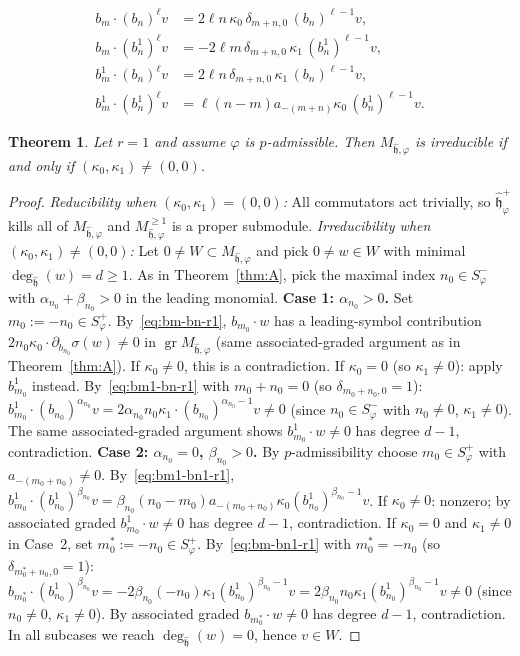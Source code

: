 \documentclass[10pt,a4paper]{amsart}
\newtheorem{theorem}{Theorem}
\DeclareMathOperator{\gr}{gr}
\newcommand{\h}{\mathfrak{h}}
\newcommand{\wh}[1]{\widehat{#1}}
\newcommand{\whh}{\wh{\h}}
\begin{document}
\begin{align}
b_m\cdot(b_n)^\ell v
  &=2\ell n\,\kappa_0\,\delta_{m+n,0}\,(b_n)^{\ell-1}v,
  \label{eq:bm-bn-r1}\\
b_m\cdot(b_n^1)^\ell v
  &=-2\ell m\,\delta_{m+n,0}\,\kappa_1\,(b_n^1)^{\ell-1}v,
  \label{eq:bm-bn1-r1}\\
b_m^1\cdot(b_n)^\ell v
  &=2\ell n\,\delta_{m+n,0}\,\kappa_1\,(b_n)^{\ell-1}v,
  \label{eq:bm1-bn-r1}\\
b_m^1\cdot(b_n^1)^\ell v
  &=\ell(n-m)a_{-(m+n)}\kappa_0\,(b_n^1)^{\ell-1}v.
  \label{eq:bm1-bn1-r1}
\end{align}

\begin{theorem}\label{thm:A-prime}
Let $r=1$ and assume $\varphi$ is $p$-admissible.  Then
$M_{\whh,\varphi}$ is irreducible if and only if
$(\kappa_0,\kappa_1)\neq(0,0)$.
\end{theorem}

\begin{proof}
\emph{Reducibility when $(\kappa_0,\kappa_1)=(0,0)$:}
All commutators act trivially, so $\whh_\varphi^+$ kills all of
$M_{\whh,\varphi}$ and $M_{\whh,\varphi}^{\ge1}$ is a proper submodule.
\emph{Irreducibility when $(\kappa_0,\kappa_1)\neq(0,0)$:}
Let $0\neq W\subset M_{\whh,\varphi}$ and pick $0\neq w\in W$ with
minimal $\deg_{\whh}(w)=d\ge1$.
As in Theorem~\ref{thm:A}, pick the maximal index $n_0\in S_\varphi^-$
with $\alpha_{n_0}+\beta_{n_0}>0$ in the leading monomial.
\textbf{Case 1: $\alpha_{n_0}>0$.}  Set $m_0:=-n_0\in S_\varphi^+$.
By~\eqref{eq:bm-bn-r1}, $b_{m_0}\cdot w$ has a leading-symbol contribution
$2n_0\kappa_0\cdot\partial_{b_{n_0}}\sigma(w)\neq0$ in
$\gr M_{\whh,\varphi}$ (same associated-graded argument as in
Theorem~\ref{thm:A}).  If $\kappa_0\neq0$, this is a contradiction.
If $\kappa_0=0$ (so $\kappa_1\neq0$): apply $b_{m_0}^1$ instead.
By~\eqref{eq:bm1-bn-r1} with $m_0+n_0=0$ (so $\delta_{m_0+n_0,0}=1$):
$b_{m_0}^1\cdot(b_{n_0})^{\alpha_{n_0}}v
=2\alpha_{n_0}n_0\kappa_1\cdot(b_{n_0})^{\alpha_{n_0}-1}v\neq0$
(since $n_0\in S_\varphi^-$ with $n_0\neq0$, $\kappa_1\neq0$).
The same associated-graded argument shows $b_{m_0}^1\cdot w\neq0$
has degree $d-1$, contradiction.
\textbf{Case 2: $\alpha_{n_0}=0$, $\beta_{n_0}>0$.}  By
$p$-admissibility choose $m_0\in S_\varphi^+$ with $a_{-(m_0+n_0)}\neq0$.
By~\eqref{eq:bm1-bn1-r1}, $b_{m_0}^1\cdot(b_{n_0}^1)^{\beta_{n_0}}v
=\beta_{n_0}(n_0-m_0)a_{-(m_0+n_0)}\kappa_0(b_{n_0}^1)^{\beta_{n_0}-1}v$.
If $\kappa_0\neq0$: nonzero; by associated graded $b_{m_0}^1\cdot w\neq0$
has degree $d-1$, contradiction.
If $\kappa_0=0$ and $\kappa_1\neq0$ in Case~2, set $m_0^*:=-n_0\in S_\varphi^+$.
By~\eqref{eq:bm-bn1-r1} with $m_0^*=-n_0$ (so $\delta_{m_0^*+n_0,0}=1$):
$b_{m_0^*}\cdot(b_{n_0}^1)^{\beta_{n_0}}v
=-2\beta_{n_0}(-n_0)\kappa_1(b_{n_0}^1)^{\beta_{n_0}-1}v
=2\beta_{n_0}n_0\kappa_1(b_{n_0}^1)^{\beta_{n_0}-1}v\neq0$
(since $n_0\neq0$, $\kappa_1\neq0$).
By associated graded $b_{m_0^*}\cdot w\neq0$ has degree $d-1$, contradiction.
In all subcases we reach $\deg_{\whh}(w)=0$, hence $v\in W$.
\end{proof}
\end{document}
